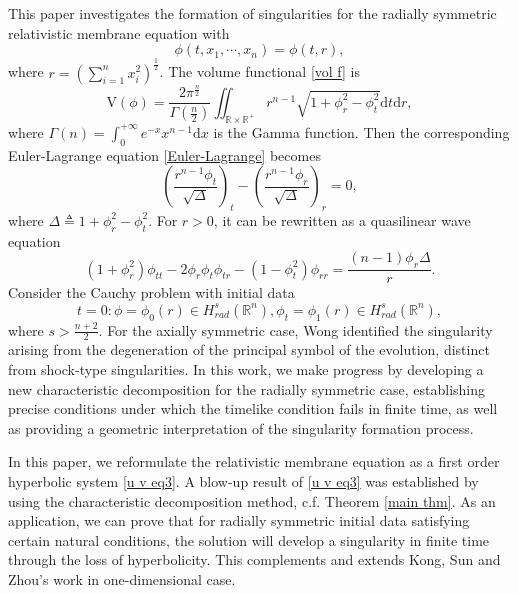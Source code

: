 \documentclass[10pt,leqno]{amsart}
\numberwithin{equation}{section}
\begin{document}
This paper investigates the formation of singularities for the radially symmetric relativistic membrane equation with
\begin{equation}
	\phi (t,x_1, \cdots, x_n) = \phi (t,r),  
\end{equation}
where $r=\left(  \sum\limits_{i=1}^{n} x_i^2\right) ^{\frac{1}{2}}$. The volume functional \eqref{vol f} is
\begin{equation}\label{A(phi)r}
	\mathrm{V}(\phi) = \frac{2\pi^{\frac{n}{2}}}{\Gamma(\frac{n}{2}) }  \iint_{\mathbb{R} \times {\mathbb{R}^+}} r^{n-1} \sqrt{1+\phi_{r}^{2}-\phi_{t}^{2}} \mathrm{d}t \mathrm{d}r,
\end{equation}
where $\Gamma(n)=\int_{0}^{+\infty} e^{-x} x^{n-1} \mathrm{d}x $ is the Gamma function. Then the corresponding Euler-Lagrange equation \eqref{Euler-Lagrange} becomes
\begin{equation}\label{Euler-Lagrange r}
	\left(\frac{r^{n-1}\phi_{t}}{\sqrt{\Delta}} \right)_{t} - \left(\frac{r^{n-1}\phi_{r}}{\sqrt{\Delta}} \right)_{r} = 0,
\end{equation}
where $ \Delta \triangleq 1+\phi_{r}^{2}-\phi_{t}^{2} $. For $r>0$, it can be rewritten as a quasilinear wave equation
\begin{equation}\label{eq1}
	(1+\phi_{r}^{2}) \phi_{tt} - 2 \phi_{r} \phi_{t} \phi_{tr} -  (1-\phi_{t}^{2}) \phi_{rr} = \frac{(n-1)\phi_{r} \Delta}{r}.
\end{equation}
Consider the Cauchy problem with initial data
\begin{equation}\label{ID phi}
	t=0: \phi=\phi_0(r) \in H_{rad}^{s} (\mathbb{R}^n), \phi_t=\phi_1(r) \in H_{rad}^{s} (\mathbb{R}^n),
\end{equation}
where $s > \frac{n+2}{2} $. For the axially symmetric case, Wong \cite{Wong18} identified the singularity arising from the degeneration of the principal symbol of the evolution, distinct from shock-type singularities. In this work, we make progress by developing a new characteristic decomposition for the radially symmetric case, establishing precise conditions under which the timelike condition fails in finite time, as well as providing a geometric interpretation of the singularity formation process.



In this paper, we reformulate the relativistic membrane equation as a first order hyperbolic system \eqref{u v eq3}. A blow-up result of \eqref{u v eq3} was established by using the characteristic decomposition method, c.f. Theorem \ref{main thm}. As an application, we can prove that for radially symmetric initial data satisfying certain natural conditions, the solution will develop a singularity in finite time through the loss of hyperbolicity. This complements and extends Kong, Sun and Zhou's work \cite{KongSunZhou06} in one-dimensional case.
\end{document}
